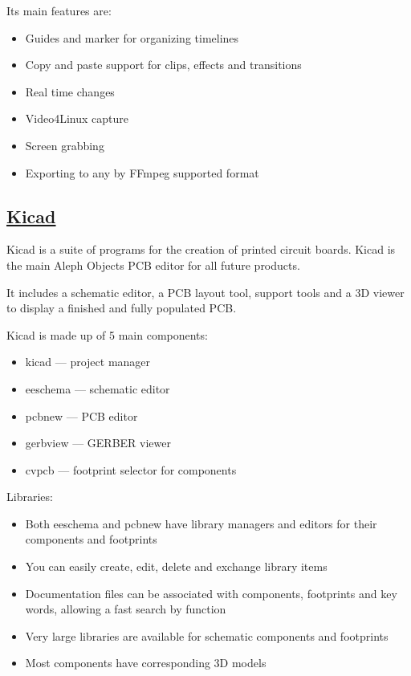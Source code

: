  Its main features are:

\begin{itemize}
 \item Guides and marker for organizing timelines
 \item Copy and paste support for clips, effects and transitions
 \item Real time changes
 \item Video4Linux capture
 \item Screen grabbing
 \item Exporting to any by FFmpeg supported format
\end{itemize}

\subsection{\href{http://www.kicad-pcb.org}{Kicad}}

Kicad is a suite of programs for the creation of printed circuit boards.
Kicad is the main Aleph Objects PCB editor for all future products.

 It includes a schematic editor, a PCB layout tool, support tools and a
 3D viewer to display a finished and fully populated PCB.
 
 Kicad is made up of 5 main components:

\begin{itemize}
 \item  kicad --- project manager
 \item  eeschema --- schematic editor
 \item  pcbnew --- PCB editor
 \item  gerbview --- GERBER viewer
 \item  cvpcb --- footprint selector for components
\end{itemize}
 
 Libraries:

\begin{itemize}
 \item Both eeschema and pcbnew have library managers and editors for their
    components and footprints
 \item You can easily create, edit, delete and exchange library items
 \item Documentation files can be associated with components, footprints and key
    words, allowing a fast search by function
 \item Very large libraries are available for schematic components and footprints
 \item Most components have corresponding 3D models
\end{itemize}

